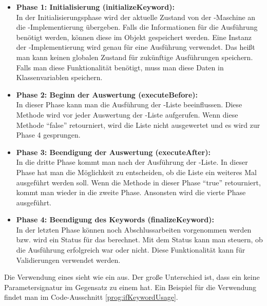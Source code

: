 \begin{itemize}

\item \textbf{Phase 1: Initialisierung (initializeKeyword):}\\
In der Initialisierungsphase wird der aktuelle Zustand von der -Maschine an die -Implementierung übergeben. Falls die Informationen für die Ausführung benötigt werden, können diese im Objekt gespeichert werden. Eine Instanz der -Implementierung wird genau für eine Ausführung verwendet. Das heißt man kann keinen globalen Zustand für zukünftige Ausführungen speichern. Falls man diese Funktionalität benötigt, muss man diese Daten in Klassenvariablen speichern.\\

\item \textbf{Phase 2: Beginn der Auswertung (executeBefore):}\\
In dieser Phase kann man die Ausführung der -Liste beeinflussen. Diese Methode wird vor jeder Auswertung der -Liste aufgerufen. Wenn diese Methode "`false"' retourniert, wird die Liste nicht ausgewertet und es wird zur Phase 4 gesprungen.\\

\item \textbf{Phase 3: Beendigung der Auswertung (executeAfter):}\\
In die dritte Phase kommt man nach der Ausführung der -Liste. In dieser Phase hat man die Möglichkeit zu entscheiden, ob die Liste ein weiteres Mal ausgeführt werden soll. Wenn die Methode in dieser Phase "`true"' retourniert, kommt man wieder in die zweite Phase. Ansonsten wird die vierte Phase ausgeführt.\\

\item \textbf{Phase 4: Beendigung des Keywords (finalizeKeyword):}\\
In der letzten Phase können noch Abschlussarbeiten vorgenommen werden bzw. wird ein Status für das  berechnet. Mit dem Status kann man steuern, ob die Ausführung erfolgreich war oder nicht. Diese Funktionalität kann für Validierungen verwendet werden.

\end{itemize}

\SuperPar
Die Verwendung eines  sieht wie ein  aus. Der große Unterschied ist, dass ein  keine Parametersignatur im Gegensatz zu einem  hat. Ein Beispiel für die Verwendung findet man im Code-Ausschnitt \ref{prog:ifKeywordUsage}.

